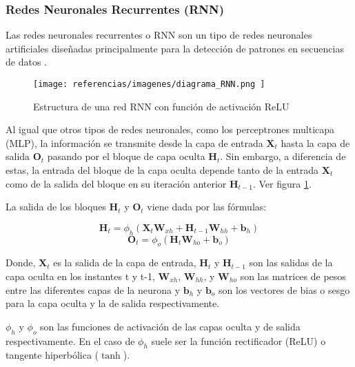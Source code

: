 \documentclass[a4paper,12pt]{article}
\begin{document}
\subsubsection{Redes Neuronales Recurrentes (RNN)}

Las redes neuronales recurrentes o RNN son un tipo de redes neuronales
artificiales diseñadas principalmente para la detección de patrones
en secuencias de datos \cite{RNN:desc}.

\begin{figure}[h]
    \centering
    \texttt{[image: 
        referencias/imagenes/diagrama\_RNN.png
    ]}
    \caption{Estructura de una red RNN con función 
    de activación ReLU}
    \label{fig:RNN}
\end{figure}

Al igual que otros tipos de redes neuronales, como los perceptrones
multicapa (MLP), la información se transmite desde la capa de entrada
$\mathbf{X}_{t}$ hasta la capa de salida $\mathbf{O}_{t}$ pasando
por el bloque de capa oculta $\mathbf{H}_{t}$. Sin embargo, 
a diferencia de estas, la entrada del bloque de la capa oculta
depende tanto de la entrada $\mathbf{X}_{t}$ como de la salida 
del bloque en su iteración anterior $\mathbf{H}_{t-1}$. Ver figura
\ref{fig:RNN}.

La salida de los bloques $\mathbf{H}_{t}$ y $\mathbf{O}_{t}$ viene
dada por las fórmulas:

\begin{equation}
    \mathbf{H}_{t} = \phi_{h}( \mathbf{X}_{t}\mathbf{W}_{xh} 
    + \mathbf{H}_{t-1}\mathbf{W}_{hh}+\mathbf{b}_{h} ) 
    \label{eq:rnn_ht}
\end{equation}
\begin{equation}
    \label{eq:rnn_ot}
    \mathbf{O}_{t} = \phi_{o} ( \mathbf{H}_{t} \mathbf{W}_{ho}
    + \mathbf{b}_{o})
\end{equation}

Donde, $\mathbf{X}_{t}$ es la salida de la capa de entrada,
$\mathbf{H}_{t}$ y $\mathbf{H}_{t-1}$ son las salidas de la capa 
oculta en los instantes t y t-1, $\mathbf{W}_{xh}$, $\mathbf{W}_{hh}$,
y $\mathbf{W}_{ho}$ son las matrices de pesos entre las diferentes
capas de la neurona y $\mathbf{b}_{h}$ y $\mathbf{b}_{o}$ son los
vectores de bias o sesgo para la capa oculta y la de salida
respectivamente. 

$\phi_{h}$ y $\phi_{o}$ son las funciones de activación 
de las capas oculta y de salida respectivamente. En el caso
de $\phi_{h}$ suele ser la función rectificador (ReLU) o 
tangente hiperbólica ($\tanh$).
\end{document}
